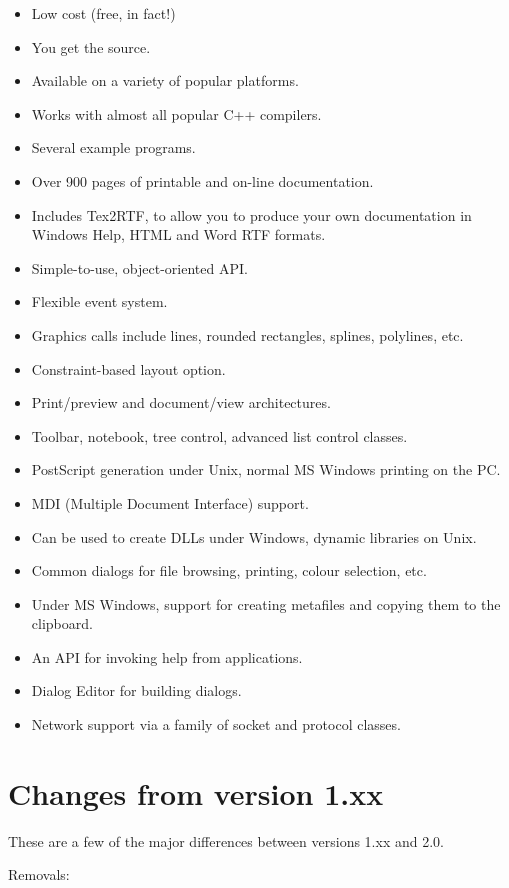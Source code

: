 \begin{itemize}\itemsep=0pt
\item Low cost (free, in fact!)
\item You get the source.
\item Available on a variety of popular platforms.
\item Works with almost all popular C++ compilers.
\item Several example programs.
\item Over 900 pages of printable and on-line documentation.
\item Includes Tex2RTF, to allow you to produce your own documentation
in Windows Help, HTML and Word RTF formats.
\item Simple-to-use, object-oriented API.
\item Flexible event system.
\item Graphics calls include lines, rounded rectangles, splines, polylines, etc.
\item Constraint-based layout option.
\item Print/preview and document/view architectures.
\item Toolbar, notebook, tree control, advanced list control classes.
\item PostScript generation under Unix, normal MS Windows printing on the
PC.
\item MDI (Multiple Document Interface) support.
\item Can be used to create DLLs under Windows, dynamic libraries on Unix.
\item Common dialogs for file browsing, printing, colour selection, etc.
\item Under MS Windows, support for creating metafiles and copying
them to the clipboard.
\item An API for invoking help from applications.
\item Dialog Editor for building dialogs.
\item Network support via a family of socket and protocol classes.
\end{itemize}

\section{Changes from version 1.xx}\label{versionchanges}

These are a few of the major differences between versions 1.xx and 2.0.

Removals:

